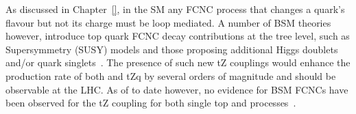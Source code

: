 As discussed in Chapter~\ref{}, in the SM any FCNC process that changes a quark's flavour but not its charge must be loop mediated.
A number of BSM theories however, introduce top quark FCNC decay contributions at the tree level, such as Supersymmetry (SUSY) models and those proposing additional Higgs doublets and/or quark singlets~\cite{AguilarSaavedra:2004wm}.
The presence of such new tZ couplings would enhance the production rate of both \ttZ and tZq by several orders of magnitude and should be observable at the LHC. 
As of to date however, no evidence for BSM FCNCs have been observed for the tZ coupling for both single top and \ttbar processes~\cite{Sirunyan:2with017kkr}.